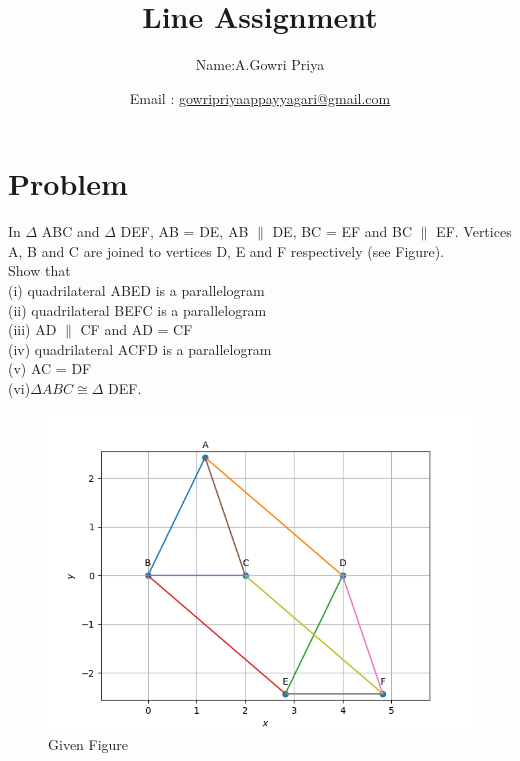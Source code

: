 \documentclass[10pt, a4paper]{article}
\begin{document}
\title{Line Assignment}
\author{Name:A.Gowri Priya\and Email :  \url{gowripriyaappayyagari@gmail.com}}
\date{}
\maketitle


  \section{Problem}
In  $\Delta$  ABC and  $\Delta$ DEF, AB = DE, AB $\parallel$ DE, BC = EF
and BC $\parallel$ EF. Vertices A, B and C are joined to
vertices D, E and F respectively (see Figure).\\
Show that\\
(i) quadrilateral ABED is a parallelogram\\
(ii) quadrilateral BEFC is a parallelogram\\
(iii) AD $\parallel$ CF and AD = CF\\
(iv) quadrilateral ACFD is a parallelogram\\
(v) AC = DF\\
(vi)$\Delta ABC \cong \Delta$  DEF.\\
\begin{figure}[h]
\centering
\includegraphics[scale=0.5]{fig.png} 
\caption{Given Figure}
\end{figure}
\end{document}
